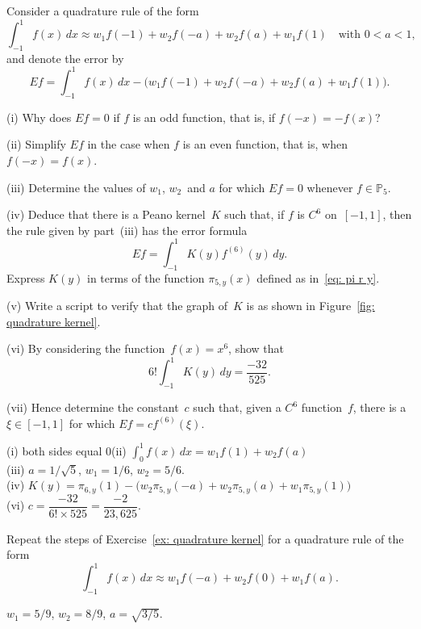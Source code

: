 \begin{Exercises}
\exercise\label{ex: quadrature kernel}
Consider a quadrature rule of the form
\[
\int_{-1}^1f(x)\,dx\approx w_1f(-1)+w_2f(-a)+w_2f(a)+w_1f(1)
\quad\text{with $0<a<1$,}
\]
and denote the error by
\[
Ef=\int_{-1}^1f(x)\,dx-\bigl(w_1f(-1)+w_2f(-a)+w_2f(a)+w_1f(1)\bigr).
\]
\begin{description}
\item{(i)} Why does $Ef=0$ if $f$ is an odd function, that is, if
$f(-x)=-f(x)$?
\item{(ii)} Simplify $Ef$ in the case when $f$ is an even function, that is, 
when $f(-x)=f(x)$. \item{(iii)}
Determine the values of $w_1$, $w_2$~and $a$ for which $Ef=0$ whenever
$f\in\mathbb{P}_5$.
\item{(iv)}
Deduce that there is a Peano kernel~$K$ such that, if $f$ is $C^6$ 
on~$[-1,1]$, then the rule given by part~(iii) has the error formula
\[
Ef=\int_{-1}^1K(y)f^{(6)}(y)\,dy.
\]
Express $K(y)$ in terms of the function $\pi_{5,y}(x)$ defined as 
in~\eqref{eq: pi r y}.
\item{(v)}
Write a script to verify that the graph of~$K$ is as shown in 
Figure~\ref{fig: quadrature kernel}.
\item{(vi)}
By considering the function~$f(x)=x^6$, show that 
\[
6!\int_{-1}^1K(y)\,dy=\frac{-32}{525}.
\]
\item{(vii)}
Hence determine the constant~$c$ such that, given a $C^6$ function~$f$,
there is a $\xi\in[-1,1]$ for which $Ef=cf^{(6)}(\xi)$.
\end{description}
\begin{ans}
(i) both sides equal $0$\quad (ii) $\int_0^1f(x)\,dx=w_1f(1)+w_2f(a)$\\
(iii) $a=1/\sqrt{5}$, $w_1=1/6$, $w_2=5/6$.\\
(iv) $K(y)=\pi_{6,y}(1)-\bigl(w_2\pi_{5,y}(-a)+w_2\pi_{5,y}(a)
+w_1\pi_{5,y}(1) \bigr)$\\
(vi) $c=\dfrac{-32}{6!\times525}=\dfrac{-2}{23,625}$.
\end{ans}

\exercise
Repeat the steps of Exercise~\ref{ex: quadrature kernel} for a quadrature rule
of the form
\[
\int_{-1}^1 f(x)\,dx\approx w_1f(-a)+w_2f(0)+w_1f(a).
\]
\begin{ans}
$w_1=5/9$, $w_2=8/9$, $a=\sqrt{3/5}$.
\end{ans}



\end{Exercises}

